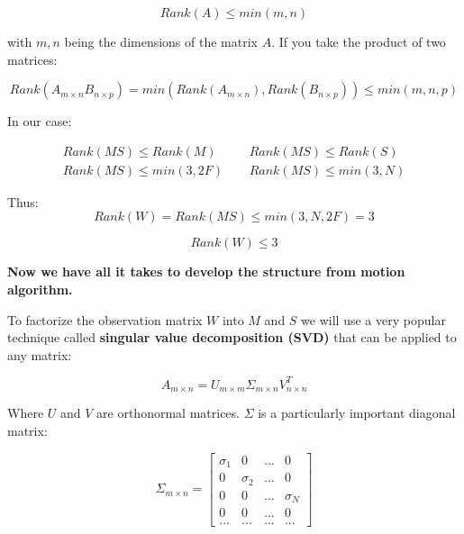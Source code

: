\documentclass{article}
\begin{document}
\begin{equation*}
    Rank(A) \leq min(m, n)
\end{equation*}

with $m, n$ being the dimensions of the matrix $A$. If you take the product of two matrices:

\begin{equation*}
    Rank(A_{m\times n}B_{n\times p}) = min(Rank(A_{m\times n}), Rank(B_{n\times p})) \leq min(m, n, p)
\end{equation*}

In our case:

\begin{equation*}
    \begin{matrix}
        Rank(MS) \leq Rank(M) & \ \ & Rank(MS) \leq Rank(S) \\
        Rank(MS) \leq min(3, 2F) & \ \ & Rank(MS) \leq min(3, N)
    \end{matrix}
\end{equation*}

Thus:
\begin{equation*}
    Rank(W) = Rank(MS) \leq min(3, N, 2F) = 3
\end{equation*}

\begin{equation*}
    Rank(W) \leq 3
\end{equation*}

\textbf{Now we have all it takes to develop the structure from motion algorithm.}

To factorize the observation matrix $W$ into $M$ and $S$ we will use a very popular technique called \textbf{singular value decomposition (SVD)} that can be applied to any matrix:

\begin{equation*}
    A_{m\times n} = U_{m\times m} \Sigma_{m\times n} V^T_{n\times n}
\end{equation*}

Where $U$ and $V$ are orthonormal matrices.
$\Sigma$ is a particularly important diagonal matrix:

\begin{equation*}
    \Sigma_{m\times n} = 
    \begin{bmatrix}
        \sigma_1 & 0 & ... & 0 \\
        0 & \sigma_2 & ... & 0 \\
        0 & 0 & ... & \sigma_N \\
        0 & 0 & ... & 0 \\
        ... & ... & ... & ...
    \end{bmatrix}
\end{equation*}
\end{document}
